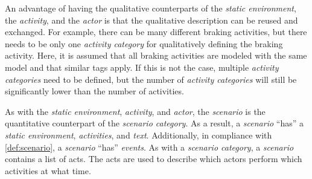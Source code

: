 An advantage of having the qualitative counterparts of the \textit{static environment}, the \textit{activity}, and the \textit{actor} is that the qualitative description can be reused and exchanged. For example, there can be many different braking activities, but there needs to be only one \textit{activity category} for qualitatively defining the braking activity. Here, it is assumed that all braking activities are modeled with the same model and that similar tags apply. If this is not the case, multiple \textit{activity categories} need to be defined, but the number of \textit{activity categories} will still be significantly lower than the number of activities.

As with the \textit{static environment}, \textit{activity}, and \textit{actor}, the \textit{scenario} is the quantitative counterpart of the \textit{scenario category}. As a result, a \textit{scenario} ``has'' a \textit{static environment}, \textit{activities}, and \textit{text}. Additionally, in compliance with \cref{def:scenario}, a \textit{scenario} ``has'' \textit{events}. As with a \textit{scenario category}, a \textit{scenario} contains a list of acts.
The acts are used to describe which actors perform which activities at what time.
